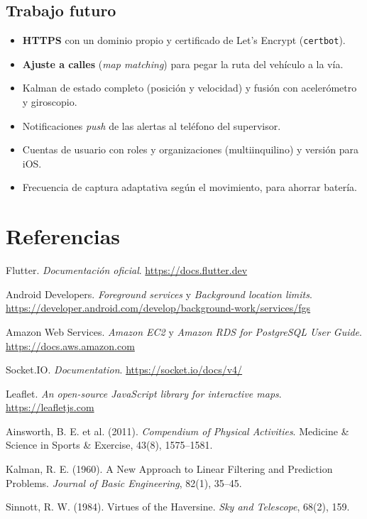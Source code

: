 \documentclass[11pt]{article}
\begin{document}
\subsection{Trabajo futuro}
\begin{itemize}
  \item \textbf{HTTPS} con un dominio propio y certificado de Let's Encrypt (\texttt{certbot}).
  \item \textbf{Ajuste a calles} (\emph{map matching}) para pegar la ruta del vehículo a la vía.
  \item Kalman de estado completo (posición y velocidad) y fusión con acelerómetro y giroscopio.
  \item Notificaciones \emph{push} de las alertas al teléfono del supervisor.
  \item Cuentas de usuario con roles y organizaciones (multiinquilino) y versión para iOS.
  \item Frecuencia de captura adaptativa según el movimiento, para ahorrar batería.
\end{itemize}

\section*{Referencias}
\begin{enumerate}[label={[\arabic*]}, leftmargin=*]
  \item Flutter. \emph{Documentación oficial}. \url{https://docs.flutter.dev}
  \item Android Developers. \emph{Foreground services} y \emph{Background location limits}.
        \url{https://developer.android.com/develop/background-work/services/fgs}
  \item Amazon Web Services. \emph{Amazon EC2} y \emph{Amazon RDS for PostgreSQL User Guide}.
        \url{https://docs.aws.amazon.com}
  \item Socket.IO. \emph{Documentation}. \url{https://socket.io/docs/v4/}
  \item Leaflet. \emph{An open-source JavaScript library for interactive maps}. \url{https://leafletjs.com}
  \item Ainsworth, B. E. et al. (2011). \emph{Compendium of Physical Activities}. Medicine \& Science in
        Sports \& Exercise, 43(8), 1575--1581.
  \item Kalman, R. E. (1960). A New Approach to Linear Filtering and Prediction Problems.
        \emph{Journal of Basic Engineering}, 82(1), 35--45.
  \item Sinnott, R. W. (1984). Virtues of the Haversine. \emph{Sky and Telescope}, 68(2), 159.
\end{enumerate}
\end{document}
